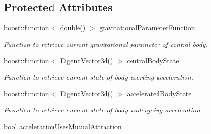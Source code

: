\subsection*{Protected Attributes}
\begin{DoxyCompactItemize}
\item 
boost\+::function$<$ double() $>$ \hyperlink{classtudat_1_1acceleration__partials_1_1CentralGravitationPartial_a24305038dc39ac405cf648c106537e4f}{gravitational\+Parameter\+Function\+\_\+}\hypertarget{classtudat_1_1acceleration__partials_1_1CentralGravitationPartial_a24305038dc39ac405cf648c106537e4f}{}\label{classtudat_1_1acceleration__partials_1_1CentralGravitationPartial_a24305038dc39ac405cf648c106537e4f}

\begin{DoxyCompactList}\small\item\em Function to retrieve current gravitational parameter of central body. \end{DoxyCompactList}\item 
boost\+::function$<$ Eigen\+::\+Vector3d() $>$ \hyperlink{classtudat_1_1acceleration__partials_1_1CentralGravitationPartial_a8316c91eb901fa1b04aa53e6e22069bf}{central\+Body\+State\+\_\+}\hypertarget{classtudat_1_1acceleration__partials_1_1CentralGravitationPartial_a8316c91eb901fa1b04aa53e6e22069bf}{}\label{classtudat_1_1acceleration__partials_1_1CentralGravitationPartial_a8316c91eb901fa1b04aa53e6e22069bf}

\begin{DoxyCompactList}\small\item\em Function to retrieve current state of body exerting acceleration. \end{DoxyCompactList}\item 
boost\+::function$<$ Eigen\+::\+Vector3d() $>$ \hyperlink{classtudat_1_1acceleration__partials_1_1CentralGravitationPartial_a3f593de984cd8c51dd65a918d12daeb7}{accelerated\+Body\+State\+\_\+}\hypertarget{classtudat_1_1acceleration__partials_1_1CentralGravitationPartial_a3f593de984cd8c51dd65a918d12daeb7}{}\label{classtudat_1_1acceleration__partials_1_1CentralGravitationPartial_a3f593de984cd8c51dd65a918d12daeb7}

\begin{DoxyCompactList}\small\item\em Function to retrieve current state of body undergoing acceleration. \end{DoxyCompactList}\item 
bool \hyperlink{classtudat_1_1acceleration__partials_1_1CentralGravitationPartial_ab51a24b74889017cf383f6737f76c771}{acceleration\+Uses\+Mutual\+Attraction\+\_\+}\hypertarget{classtudat_1_1acceleration__partials_1_1CentralGravitationPartial_ab51a24b74889017cf383f6737f76c771}{}\label{classtudat_1_1acceleration__partials_1_1CentralGravitationPartial_ab51a24b74889017cf383f6737f76c771}


\end{DoxyCompactItemize}

